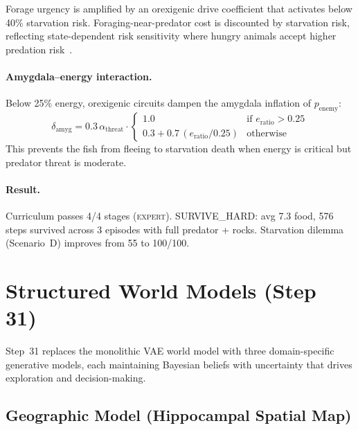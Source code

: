 \documentclass[11pt,a4paper]{article}
\begin{document}
Forage urgency is amplified by an orexigenic drive coefficient
that activates below 40\% starvation risk.  Foraging-near-predator
cost is discounted by starvation risk, reflecting state-dependent
risk sensitivity where hungry animals accept higher predation
risk~\cite{lima1990}.

\paragraph{Amygdala--energy interaction.}
Below 25\% energy, orexigenic circuits dampen the amygdala inflation
of $p_\text{enemy}$:
\begin{equation}
  \delta_\text{amyg} = 0.3\,\alpha_\text{threat} \cdot
  \begin{cases}
    1.0 & \text{if } e_\text{ratio} > 0.25 \\
    0.3 + 0.7\,(e_\text{ratio}/0.25) & \text{otherwise}
  \end{cases}
\end{equation}
This prevents the fish from fleeing to starvation death when energy is
critical but predator threat is moderate.

\paragraph{Result.}
Curriculum passes 4/4 stages (\textsc{expert}).
SURVIVE\_HARD: avg 7.3 food, 576 steps survived across 3 episodes
with full predator + rocks.  Starvation dilemma (Scenario~D)
improves from 55 to 100/100.

\section{Structured World Models (Step 31)}\label{sec:world_models}

Step~31 replaces the monolithic VAE world model with three
domain-specific generative models, each maintaining Bayesian beliefs
with uncertainty that drives exploration and decision-making.

\subsection{Geographic Model (Hippocampal Spatial Map)}
\end{document}
